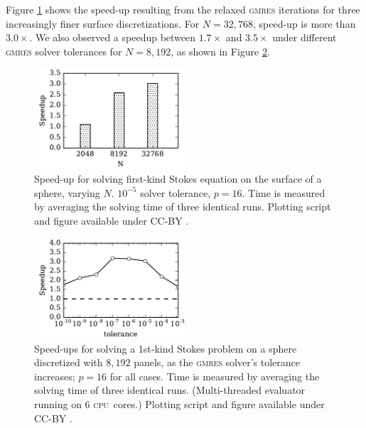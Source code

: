 \documentclass[final,3p,times]{elsarticle}
\newcommand{\cpu}{\textsc{cpu}}
\newcommand{\gmres}{\textsc{gmres}\xspace}
\begin{document}

Figure \ref{fig:stokes_speedup} shows the speed-up resulting from the relaxed \gmres iterations for three increasingly finer surface discretizations. For $N=32,768$, speed-up is more than $3.0\times$. We also observed a speedup between $1.7\times$ and $3.5\times$ under different \gmres solver tolerances for $N=8,192$, as shown in Figure \ref{fig:stokes_tolerance_speedup}.


\begin{figure}%
\begin{center}
	\includegraphics[natwidth=3in,natheight=2in,width=0.5\textwidth]{StokesSpeedupRelaxation.pdf}
	\caption{Speed-up for solving first-kind Stokes equation on the surface of a sphere, varying $N$. $10^{-5}$ solver tolerance, $p=16$. Time is measured by averaging the solving time of three identical runs. Plotting script and figure available under CC-BY \cite{WangLaytonBarba2016-figshare3}.}
	\label{fig:stokes_speedup}
\end{center}
\end{figure}

\begin{figure}%
	\centering
	\includegraphics[natwidth=3in,natheight=2in,width=0.5\textwidth]{StokesSpeedupTolerance.pdf}
	\caption{Speed-ups for solving a 1st-kind Stokes problem on a sphere discretized with $8,192$ panels, as the \gmres solver's tolerance increases; $p=16$ for all cases. Time is measured by averaging the solving time of three identical runs. (Multi-threaded evaluator running on 6 \cpu\ cores.) Plotting script and figure available under CC-BY \cite{WangLaytonBarba2016-figshare3}.}
	\label{fig:stokes_tolerance_speedup}
\end{figure}
\end{document}
